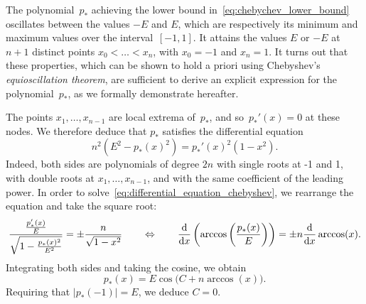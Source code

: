 \begin{remark}
    \label{remark:cheb}
    The polynomial~$p_*$ achieving the lower bound in~\eqref{eq:chebychev_lower_bound}
    oscillates between the values $-E$ and $E$,
    which are respectively its minimum and maximum values over the interval~$[-1, 1]$.
    It attains the values $E$ or $-E$ at $n+1$ distinct points $x_0 < \dotsc < x_n$,
    with $x_0 = -1$ and $x_n = 1$.
    It turns out that these properties,
    which can be shown to hold a priori using Chebyshev's \emph{equioscillation theorem},
    are sufficient to derive an explicit expression for the polynomial~$p_*$,
    as we formally demonstrate hereafter.

    The points $x_1, \dotsc, x_{n-1}$
    are local extrema of~$p_*$,
    and so~$p_*'(x) = 0$ at these nodes.
    We therefore deduce that $p_*$ satisfies the differential equation
    \begin{equation}
        \label{eq:differential_equation_chebyshev}
        n^2\left(E^2 - p_*(x)^2\right) = p_*'(x)^2 (1 - x^2).
    \end{equation}
    Indeed, both sides are polynomials of degree $2n$ with single roots at -1 and 1,
    with double roots at $x_1, \dotsc, x_{n-1}$,
    and with the same coefficient of the leading power.
    In order to solve~\eqref{eq:differential_equation_chebyshev},
    we rearrange the equation and take the square root:
    \[
        \frac{\frac{p_*'(x)}{E}}{\sqrt{1 - \frac{p_*(x)^2}{E^2}}} = \pm \frac{n}{\sqrt{1 - x^2}}
        \qquad \Leftrightarrow \qquad
        \frac{\mathrm d}{\mathrm d x} \left( \arccos\left(\frac{p_*(x)}{E}\right) \right) = \pm n \frac{\mathrm d}{\mathrm d x} \arccos(x).
    \]
    Integrating both sides and taking the cosine,
    we obtain
    \[
        p_*(x) = E \cos\bigl(C + n \arccos(x)\bigr).
    \]
    Requiring that $|p_*(-1)| = E$, we deduce $C = 0$.
\end{remark}

